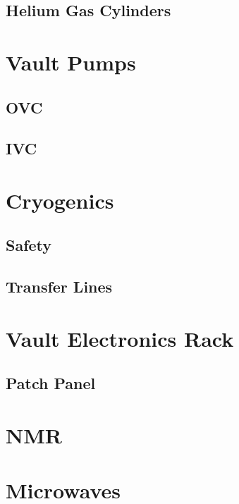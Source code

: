   \subsection{Helium Gas Cylinders}

  
\section{Vault Pumps}
  \subsection{OVC}
  \subsection{IVC}

\section{Cryogenics}
  \subsection{Safety}
  \subsection{Transfer Lines}

\section{Vault Electronics Rack}
  \subsection{Patch Panel}
  \subsection{}

\section{NMR}

\section{Microwaves}